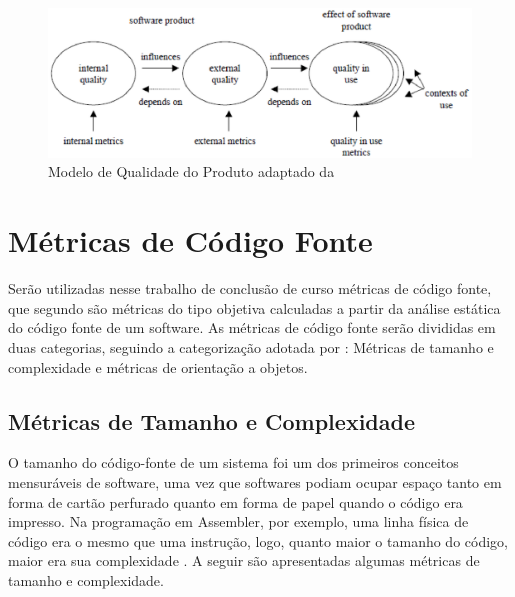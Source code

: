 	
\begin{figure}[h!]
\centering
\includegraphics[keepaspectratio=false,scale=0.90]{figuras/figuras_matheus/tipos_medidas_INGLES.eps}
\caption{Modelo de Qualidade do Produto adaptado da 
}
\label{fig:modelodequalidade}
\end{figure}
\FloatBarrier


\section{Métricas de Código Fonte}

Serão utilizadas nesse trabalho de conclusão de curso métricas de código fonte, que segundo  são métricas do tipo objetiva calculadas a partir da análise estática do código fonte de um software. As métricas de código fonte serão divididas em duas categorias, seguindo a categorização adotada por : Métricas de tamanho e complexidade e métricas de orientação a objetos.

\subsection{Métricas de Tamanho e Complexidade}

O tamanho do código-fonte de um sistema foi um dos primeiros conceitos mensuráveis de software, uma vez que softwares podiam ocupar espaço tanto em forma de cartão perfurado quanto em forma de papel quando o código era impresso. Na programação em Assembler, por exemplo, uma linha física de código era o mesmo que uma instrução, logo, quanto maior o tamanho do código, maior era sua complexidade \cite{metricsandmodels}. A seguir são apresentadas algumas métricas de tamanho e complexidade.

